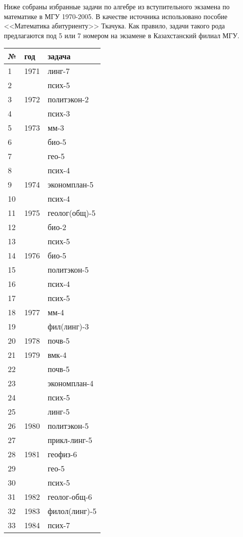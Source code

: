 \documentclass[12pt,a4paper]{report}
\begin{document}
Ниже собраны избранные задачи по алгебре из вступительного экзамена по математике в МГУ 1970-2005. В качестве источника использовано пособие <<Математика абитуриенту>> Ткачука. Как правило, задачи такого рода предлагаются под 5 или 7 номером на экзамене в Казахстанский филиал МГУ.

\begin{center}

\begin{tabular}{|l|l|l|}
\hline
№&год&задача\\
\hline
1&1971&линг-7\\
\hline
2&&псих-5\\
\hline
3&1972&политэкон-2\\
\hline
4&&псих-3\\
\hline
5&1973&мм-3\\
\hline
6&&био-5\\
\hline
7&&гео-5\\
\hline
8&&псих-4\\
\hline
9&1974&экономплан-5\\
\hline
10&&псих-4\\
\hline
11&1975&геолог(общ)-5\\
\hline
12&&био-2\\
\hline
13&&псих-5\\
\hline
14&1976&био-5\\
\hline
15&&политэкон-5\\
\hline
16&&псих-4\\
\hline
17&&псих-5\\
\hline
18&1977&мм-4\\
\hline
19&&фил(линг)-3\\
\hline
20&1978&почв-5\\
\hline
21&1979&вмк-4\\
\hline
22&&почв-5\\
\hline
23&&экономплан-4\\
\hline
24&&псих-5\\
\hline
25&&линг-5\\
\hline
26&1980&политэкон-5\\
\hline
27&&прикл-линг-5\\
\hline
28&1981&геофиз-6\\
\hline
29&&гео-5\\
\hline
30&&псих-5\\
\hline
31&1982&геолог-общ-6\\
\hline
32&1983&филол(линг)-5\\
\hline
33&1984&псих-7\\

\end{tabular}
\end{center}
\end{document}
